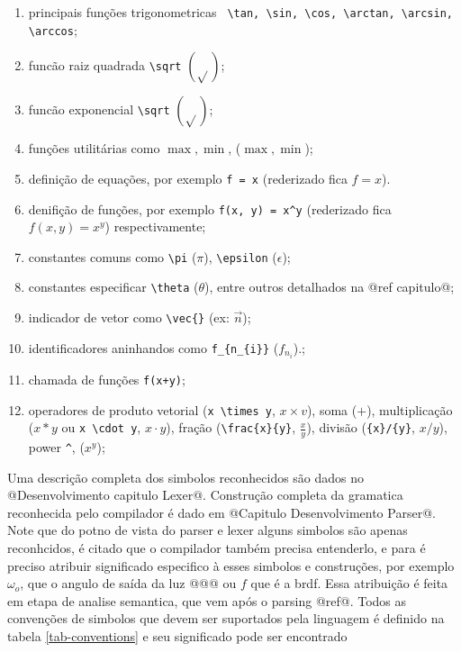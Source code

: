 \label{subconjunto-latex-equantion} \begin{enumerate}
  \item principais funções trigonometricas \verb" \tan, \sin, \cos, \arctan, \arcsin, \arccos";

\item funcão raiz quadrada \verb"\sqrt" $\left(\sqrt{}\right)$;
\item funcão exponencial \verb"\sqrt" $\left(\sqrt{}\right)$;
\item funções utilitárias como $\max, \min$, ($\max, \min$);
\item definição de equações, por exemplo \verb"f = x" (rederizado fica $f = x$).
\item denifição de funções, por exemplo  \verb"f(x, y) = x^y" (rederizado fica $f(x, y) = x^y$) respectivamente;
\item constantes comuns como \verb"\pi" ($\pi$), \verb"\epsilon" ($\epsilon$);
\item constantes especificar \verb"\theta" ($\theta$), entre outros detalhados na @ref capitulo@;
\item indicador de vetor como \verb"\vec{}" (ex: $\vec{n}$);
\item identificadores aninhandos como \verb"f_{n_{i}}" ($f_{n_{i}}$).;
\item chamada de funções \verb"f(x+y)";
\item operadores de produto vetorial (\verb"x \times y", $x \times v$), soma ($+$), multiplicação ($x*y$ ou \verb"x \cdot y", $x \cdot y$), fração (\verb"\frac{x}{y}", $\frac{x}{y}$), divisão (\verb"{x}/{y}", ${x}/{y}$), power \verb"^", ($x^y$);

\end{enumerate}

Uma descrição completa dos simbolos reconhecidos são dados no @Desenvolvimento capitulo Lexer@. Construção completa da gramatica reconhecida pelo compilador é dado em @Capitulo Desenvolvimento Parser@. Note que do potno de vista do parser e lexer alguns simbolos são apenas reconhcidos, é citado que o compilador também precisa entenderlo, e para é preciso atribuir significado especifico à esses simbolos e construções, por exemplo $\omega_o$, que o angulo de saída da luz @@@ ou $f$ que é a brdf. Essa atribuição é feita em etapa de analise semantica, que vem após o parsing @ref@. Todos as convenções de simbolos que devem ser suportados pela linguagem é definido na tabela \autoref{tab-conventions} e seu significado pode ser encontrado

